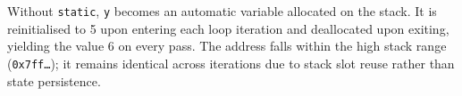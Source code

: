 
Without \texttt{static}, \texttt{y} becomes an automatic variable allocated on
the stack. It is reinitialised to 5 upon entering each loop iteration and
deallocated upon exiting, yielding the value 6 on every pass. The address falls
within the high stack range (\texttt{0x7ff\ldots}); it remains identical across
iterations due to stack slot reuse rather than state persistence.
